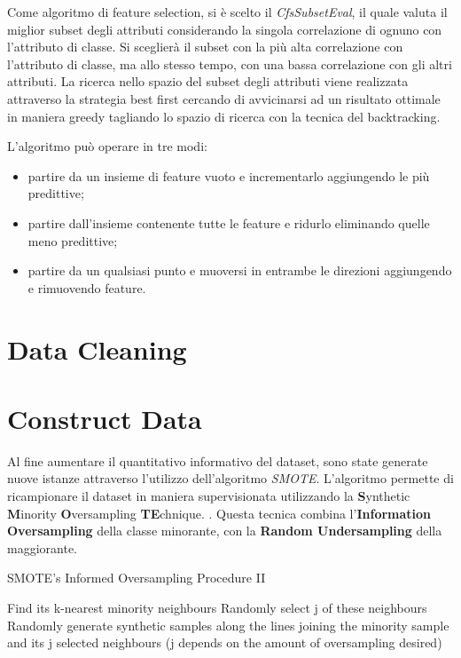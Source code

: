 Come algoritmo di feature selection, si è scelto il \textit{CfsSubsetEval}, il quale valuta il miglior subset degli attributi considerando la singola correlazione di ognuno con l'attributo di classe. Si sceglierà il subset con la più alta correlazione con l'attributo di classe, ma allo stesso tempo, con una bassa correlazione con gli altri attributi. La ricerca nello spazio del subset degli attributi viene realizzata attraverso la strategia best first cercando di avvicinarsi ad un risultato ottimale in maniera greedy tagliando lo spazio di ricerca con la tecnica del backtracking.\cite{Hall1998}

L'algoritmo può operare in tre modi:
\begin{itemize}
	\item partire da un insieme di feature vuoto e incrementarlo aggiungendo le più predittive;
	\item partire dall'insieme contenente tutte le feature e ridurlo eliminando quelle meno predittive;
	\item partire da un qualsiasi punto e muoversi in entrambe le direzioni aggiungendo e rimuovendo feature.
\end{itemize}

\section{Data Cleaning}

\section{Construct Data}
\label{SMOTE}
Al fine aumentare il quantitativo informativo del dataset, sono state generate nuove istanze attraverso l'utilizzo dell'algoritmo \textit{SMOTE}. L'algoritmo permette di ricampionare il dataset in maniera supervisionata utilizzando la \textbf{S}ynthetic \textbf{M}inority \textbf{O}versampling \textbf{TE}chnique. 
\cite{Chawla02smote:synthetic}. Questa tecnica combina l'\textbf{Information Oversampling} della classe minorante, con la \textbf{Random Undersampling} della maggiorante.

\begin{algorithm}
	\caption{SMOTE’s Informed Oversampling Procedure II}
	\begin{algorithmic} 
		\STATE Find its k-nearest minority neighbours
		\STATE Randomly select j of these neighbours
		\STATE Randomly generate synthetic samples along the lines joining the minority sample and its j selected neighbours
		(j depends on the amount of oversampling desired) 
		\ENDFOR
	\end{algorithmic}
\end{algorithm}

